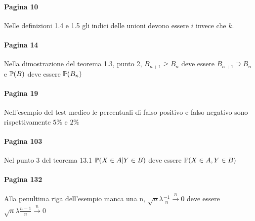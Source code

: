 \paragraph{Pagina 10} Nelle definizioni 1.4 e 1.5 gli indici delle unioni devono essere $i$ invece che $k$.

\paragraph{Pagina 14} Nella dimostrazione del teorema 1.3, punto 2, $B_{n+1} \geq B_n$ deve essere $B_{n+1} \supseteq B_n$ e $\mathbb P(B)$ deve essere $\mathbb P(B_n)$

\paragraph{Pagina 19} Nell'esempio del test medico le percentuali di falso positivo e falso negativo sono rispettivamente $5\%$ e $2\%$

\paragraph{Pagina 103} Nel punto 3 del teorema 13.1 $\mathbb P(X \in A | Y \in B)$ deve essere $\mathbb P(X \in A, Y \in B)$

\paragraph{Pagina 132} Alla penultima riga dell'esempio manca una n, $\sqrt n \lambda \frac{-1} n \xrightarrow{n} 0$ deve essere $\sqrt n \lambda \frac{n-1} n \xrightarrow{n} 0$